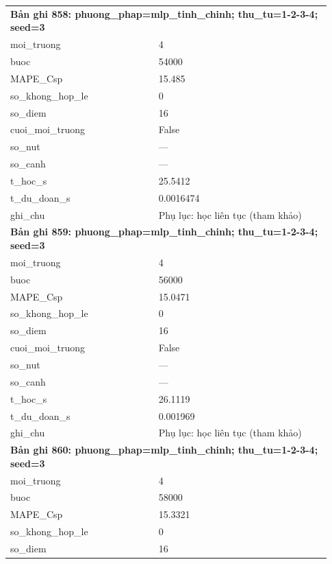 \begin{longtable}{p{0.43\linewidth}p{0.50\linewidth}}
\midrule
\multicolumn{2}{p{0.95\linewidth}}{\textbf{Bản ghi 858: phuong\_phap=mlp\_tinh\_chinh; thu\_tu=1-2-3-4; seed=3}} \\
moi\_\allowbreak truong & 4 \\
buoc & 54000 \\
MAPE\_\allowbreak Csp & 15.485 \\
so\_\allowbreak khong\_\allowbreak hop\_\allowbreak le & 0 \\
so\_\allowbreak diem & 16 \\
cuoi\_\allowbreak moi\_\allowbreak truong & False \\
so\_\allowbreak nut & — \\
so\_\allowbreak canh & — \\
t\_\allowbreak hoc\_\allowbreak s & 25.5412 \\
t\_\allowbreak du\_\allowbreak doan\_\allowbreak s & 0.0016474 \\
ghi\_\allowbreak chu & Phụ lục: học liên tục (tham khảo) \\
\midrule
\multicolumn{2}{p{0.95\linewidth}}{\textbf{Bản ghi 859: phuong\_phap=mlp\_tinh\_chinh; thu\_tu=1-2-3-4; seed=3}} \\
moi\_\allowbreak truong & 4 \\
buoc & 56000 \\
MAPE\_\allowbreak Csp & 15.0471 \\
so\_\allowbreak khong\_\allowbreak hop\_\allowbreak le & 0 \\
so\_\allowbreak diem & 16 \\
cuoi\_\allowbreak moi\_\allowbreak truong & False \\
so\_\allowbreak nut & — \\
so\_\allowbreak canh & — \\
t\_\allowbreak hoc\_\allowbreak s & 26.1119 \\
t\_\allowbreak du\_\allowbreak doan\_\allowbreak s & 0.001969 \\
ghi\_\allowbreak chu & Phụ lục: học liên tục (tham khảo) \\
\midrule
\multicolumn{2}{p{0.95\linewidth}}{\textbf{Bản ghi 860: phuong\_phap=mlp\_tinh\_chinh; thu\_tu=1-2-3-4; seed=3}} \\
moi\_\allowbreak truong & 4 \\
buoc & 58000 \\
MAPE\_\allowbreak Csp & 15.3321 \\
so\_\allowbreak khong\_\allowbreak hop\_\allowbreak le & 0 \\
so\_\allowbreak diem & 16 \\

\end{longtable}
